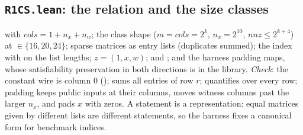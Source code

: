 \subsection{\texttt{R1CS.lean}: the relation and the size classes}

 with $\mathit{cols}=1+n_x+n_w$; the class shape 
($m=\mathit{cols}=2^k$, $n_x=2^{10}$, $\mathit{nnz}\le2^{k+4}$) at ${}\in\{16,20,24\}$;
sparse matrices as entry lists (duplicates summed); the index with  on the list
lengths; $z=(1,x,w)$;  and ; and the harness padding maps, whose
satisfiability preservation in both directions is  in the library.
\emph{Check}: the constant wire is column 0 ();  sums all entries
of row $r$;  quantifies over every row; padding keeps public inputs at their columns,
moves witness columns past the larger $n_x$, and pads $x$ with zeros. A statement is a
representation: equal matrices given by different lists are different statements, so the harness
fixes a canonical form for benchmark indices.

